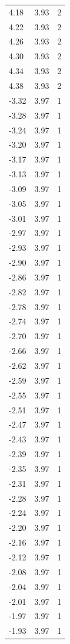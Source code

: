 \begin{longtable}{lrr}
  4.18 & 3.93 & 2 \\
  4.22 & 3.93 & 2 \\
  4.26 & 3.93 & 2 \\
  4.30 & 3.93 & 2 \\
  4.34 & 3.93 & 2 \\
  4.38 & 3.93 & 2 \\
  -3.32 & 3.97 & 1 \\
  -3.28 & 3.97 & 1 \\
  -3.24 & 3.97 & 1 \\
  -3.20 & 3.97 & 1 \\
  -3.17 & 3.97 & 1 \\
  -3.13 & 3.97 & 1 \\
  -3.09 & 3.97 & 1 \\
  -3.05 & 3.97 & 1 \\
  -3.01 & 3.97 & 1 \\
  -2.97 & 3.97 & 1 \\
  -2.93 & 3.97 & 1 \\
  -2.90 & 3.97 & 1 \\
  -2.86 & 3.97 & 1 \\
  -2.82 & 3.97 & 1 \\
  -2.78 & 3.97 & 1 \\
  -2.74 & 3.97 & 1 \\
  -2.70 & 3.97 & 1 \\
  -2.66 & 3.97 & 1 \\
  -2.62 & 3.97 & 1 \\
  -2.59 & 3.97 & 1 \\
  -2.55 & 3.97 & 1 \\
  -2.51 & 3.97 & 1 \\
  -2.47 & 3.97 & 1 \\
  -2.43 & 3.97 & 1 \\
  -2.39 & 3.97 & 1 \\
  -2.35 & 3.97 & 1 \\
  -2.31 & 3.97 & 1 \\
  -2.28 & 3.97 & 1 \\
  -2.24 & 3.97 & 1 \\
  -2.20 & 3.97 & 1 \\
  -2.16 & 3.97 & 1 \\
  -2.12 & 3.97 & 1 \\
  -2.08 & 3.97 & 1 \\
  -2.04 & 3.97 & 1 \\
  -2.01 & 3.97 & 1 \\
  -1.97 & 3.97 & 1 \\
  -1.93 & 3.97 & 1 \\

\end{longtable}
